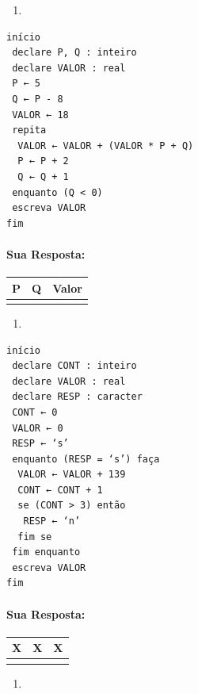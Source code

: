 \documentclass[12pt,a4paper]{article}
\providecommand{\tightlist}{%
      \setlength{\itemsep}{0pt}\setlength{\parskip}{0pt}}
\begin{document}
    \begin{enumerate}
\def\labelenumi{\alph{enumi})}
\setcounter{enumi}{4}
\tightlist
\item
\end{enumerate}

\begin{verbatim}
início
 declare P, Q : inteiro
 declare VALOR : real
 P ← 5
 Q ← P - 8
 VALOR ← 18
 repita
  VALOR ← VALOR + (VALOR * P + Q)
  P ← P + 2
  Q ← Q + 1
 enquanto (Q < 0)
 escreva VALOR
fim 
\end{verbatim}

    \hypertarget{sua-resposta}{%
\paragraph{Sua Resposta:}\label{sua-resposta}}

\begin{longtable}[]{@{}ccc@{}}
\toprule()
P & Q & Valor \\
\midrule()
\endhead
& & \\
\bottomrule()
\end{longtable}

    \begin{enumerate}
\def\labelenumi{\alph{enumi})}
\setcounter{enumi}{5}
\tightlist
\item
\end{enumerate}

\begin{verbatim}
início
 declare CONT : inteiro
 declare VALOR : real
 declare RESP : caracter
 CONT ← 0
 VALOR ← 0
 RESP ← ‘s’
 enquanto (RESP = ‘s’) faça
  VALOR ← VALOR + 139
  CONT ← CONT + 1
  se (CONT > 3) então
   RESP ← ‘n’
  fim se
 fim enquanto
 escreva VALOR
fim
\end{verbatim}

    \hypertarget{sua-resposta}{%
\paragraph{Sua Resposta:}\label{sua-resposta}}

\begin{longtable}[]{@{}ccc@{}}
\toprule()
X & X & X \\
\midrule()
\endhead
& & \\
\bottomrule()
\end{longtable}

    \begin{enumerate}
\def\labelenumi{\alph{enumi})}
\setcounter{enumi}{6}
\tightlist
\item
\end{enumerate}
\end{document}
